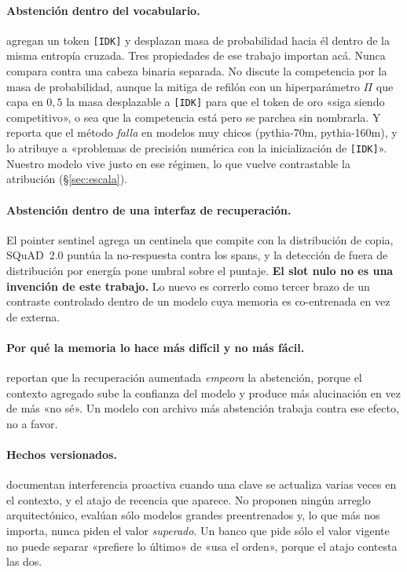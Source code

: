 \documentclass[11pt,a4paper]{article}
\begin{document}
\paragraph{Abstención dentro del vocabulario.} \citet{cohen2024idk} agregan un token \texttt{[IDK]} y
desplazan masa de probabilidad hacia él dentro de la misma entropía cruzada. Tres propiedades de ese
trabajo importan acá. Nunca compara contra una cabeza binaria separada. No discute la competencia por
la masa de probabilidad, aunque la mitiga de refilón con un hiperparámetro $\Pi$ que capa en $0{,}5$
la masa desplazable a \texttt{[IDK]} para que el token de oro «siga siendo competitivo», o sea que la
competencia está pero se parchea sin nombrarla. Y reporta que el método \emph{falla} en modelos muy
chicos (pythia-70m, pythia-160m), y lo atribuye a «problemas de precisión numérica con la
inicialización de \texttt{[IDK]}». Nuestro modelo vive justo en ese régimen, lo que vuelve
contrastable la atribución (§\ref{sec:escala}).

\paragraph{Abstención dentro de una interfaz de recuperación.} El pointer sentinel
\citep{merity2016pointer} agrega un centinela que compite con la distribución de copia, SQuAD~2.0
\citep{rajpurkar2018squad2} puntúa la no-respuesta contra los spans, y la detección de fuera de
distribución por energía \citep{liu2020energy} pone umbral sobre el puntaje. \textbf{El slot nulo no
es una invención de este trabajo.} Lo nuevo es correrlo como tercer brazo de un contraste controlado
dentro de un modelo cuya memoria es co-entrenada en vez de externa.

\paragraph{Por qué la memoria lo hace más difícil y no más fácil.} \citet{joren2024sufficient}
reportan que la recuperación aumentada \emph{empeora} la abstención, porque el contexto agregado sube
la confianza del modelo y produce más alucinación en vez de más «no sé». Un modelo con archivo más
abstención trabaja contra ese efecto, no a favor.

\paragraph{Hechos versionados.} \citet{wang2025unable} documentan interferencia proactiva cuando una
clave se actualiza varias veces en el contexto, y el atajo de recencia que aparece. No proponen
ningún arreglo arquitectónico, evalúan sólo modelos grandes preentrenados y, lo que más nos importa,
nunca piden el valor \emph{superado}. Un banco que pide sólo el valor vigente no puede separar
«prefiere lo último» de «usa el orden», porque el atajo contesta las dos.
\end{document}
